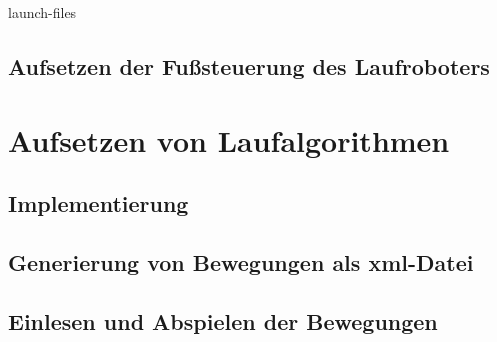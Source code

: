 launch-files

\subsection{Aufsetzen der Fußsteuerung des Laufroboters}

\section{Aufsetzen von Laufalgorithmen}

\subsection{Implementierung}
\subsection{Generierung von Bewegungen als xml-Datei}
\subsection{Einlesen und Abspielen der Bewegungen}
